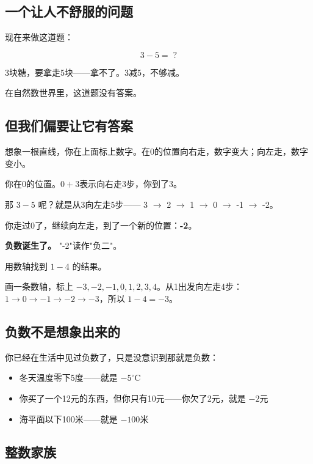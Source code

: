 
\subsection*{一个让人不舒服的问题}

现在来做这道题：

\[
3-5 = \;?
\]

3块糖，要拿走5块——拿不了。3减5，不够减。

在自然数世界里，这道题没有答案。

\subsection*{但我们偏要让它有答案}

想象一根直线，你在上面标上数字。在0的位置向右走，数字变大；向左走，数字变小。

你在0的位置。$0+3$表示向右走3步，你到了3。

那 $3-5$ 呢？就是从3向左走5步——
3 $\to$ 2 $\to$ 1 $\to$ 0 $\to$ -1 $\to$ -2。

你走过0了，继续向左走，到了一个新的位置：\textbf{-2}。

\textbf{负数诞生了。} "-2"读作"负二"。

\begin{example}
用数轴找到 $1-4$ 的结果。
\end{example}
\begin{solution}
画一条数轴，标上 $-3,-2,-1,0,1,2,3,4$。从1出发向左走4步：\\
$1\to0\to-1\to-2\to-3$，所以 $1-4 = -3$。
\end{solution}

\subsection*{负数不是想象出来的}

你已经在生活中见过负数了，只是没意识到那就是负数：

\begin{itemize}
  \item 冬天温度零下5度——就是 $-5^\circ$C
  \item 你买了一个12元的东西，但你只有10元——你欠了2元，就是 $-2$元
  \item 海平面以下100米——就是 $-100$米
\end{itemize}

\subsection*{整数家族}

